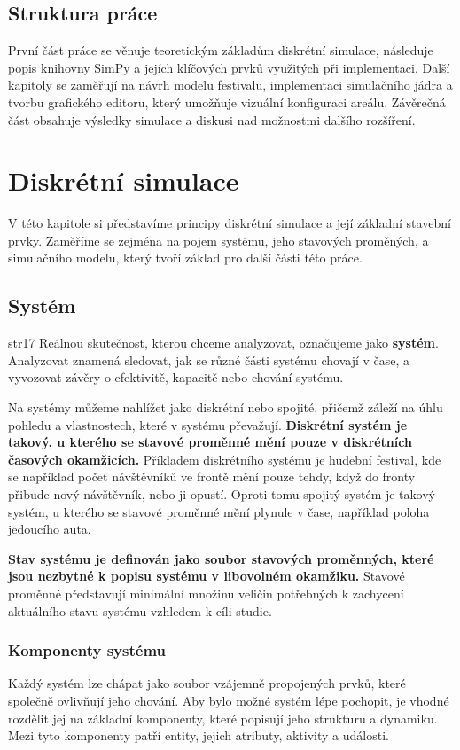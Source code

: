 \documentclass[
  program=itp,
  biblatex,
  figures=false,
  glossaries,
  index
]{kidiplom}
\begin{document}
\subsection{Struktura práce}
První část práce se věnuje teoretickým základům diskrétní simulace, následuje popis knihovny SimPy a jejích klíčových prvků využitých při implementaci. Další kapitoly se zaměřují na návrh modelu festivalu, implementaci simulačního jádra a tvorbu grafického editoru, který umožňuje vizuální konfiguraci areálu. Závěrečná část obsahuje výsledky simulace a diskusi nad možnostmi dalšího rozšíření.

\section{Diskrétní simulace}
V této kapitole si představíme principy diskrétní simulace a její základní stavební prvky. Zaměříme se zejména na pojem systému, jeho stavových proměných, a simulačního modelu, který tvoří základ pro další části této práce.

\subsection{Systém} str17
Reálnou skutečnost, kterou chceme analyzovat, označujeme jako {\bf systém}. Analyzovat znamená sledovat, jak se různé části systému chovají v čase, a vyvozovat závěry o efektivitě, kapacitě nebo chování systému.

Na systémy můžeme nahlížet jako diskrétní nebo spojité, přičemž záleží na úhlu pohledu a vlastnostech, které v systému převažují. {\bf Diskrétní systém je takový, u kterého se stavové proměnné mění pouze v diskrétních časových okamžicích.} Příkladem diskrétního systému je hudební festival, kde se například počet návštěvníků ve frontě mění pouze tehdy, když do fronty přibude nový návštěvník, nebo ji opustí.  Oproti tomu spojitý systém je takový systém, u kterého se stavové proměnné mění plynule v čase, například poloha jedoucího auta. 

 {\bf Stav systému je definován jako soubor stavových proměnných, které jsou nezbytné k popisu systému v libovolném okamžiku.} Stavové proměnné představují minimální množinu veličin potřebných k zachycení aktuálního stavu systému vzhledem k cíli studie.


\subsubsection{Komponenty systému}
Každý systém lze chápat jako soubor vzájemně propojených prvků, které společně ovlivňují jeho chování. Aby bylo možné systém lépe pochopit, je vhodné rozdělit jej na základní komponenty, které popisují jeho strukturu a dynamiku. Mezi tyto komponenty patří entity, jejich atributy, aktivity a události.
\end{document}
